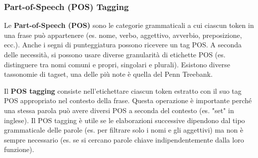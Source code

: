 \documentclass{article}
\begin{document}
\subsubsection{Part-of-Speech (POS) Tagging}
Le \textbf{Part-of-Speech (POS)} sono le categorie grammaticali a cui ciascun token in una frase può appartenere (es. nome, verbo, aggettivo, avverbio, preposizione, ecc.). Anche i segni di punteggiatura possono ricevere un tag POS.
A seconda delle necessità, si possono usare diverse granularità di etichette POS (es. distinguere tra nomi comuni e propri, singolari e plurali). Esistono diverse tassonomie di tagset, una delle più note è quella del Penn Treebank.

Il \textbf{POS tagging} consiste nell'etichettare ciascun token estratto con il suo tag POS appropriato nel contesto della frase. Questa operazione è importante perché una stessa parola può avere diversi POS a seconda del contesto (es. "set" in inglese). Il POS tagging è utile se le elaborazioni successive dipendono dal tipo grammaticale delle parole (es. per filtrare solo i nomi e gli aggettivi) ma non è sempre necessario (es. se si cercano parole chiave indipendentemente dalla loro funzione).
\end{document}
